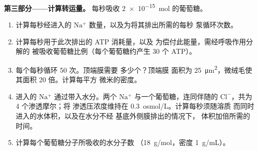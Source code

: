 \begin{problem}
\medskip
\noindent\textbf{第三部分——计算转运量。}
每秒吸收 \qty{2e-15}{mol} 的葡萄糖。
\begin{enumerate}[resume]
  \item 计算每秒经进入的
        $\mathrm{Na^+}$ 数量，以及为将其排出所需的每秒
        泵循环次数。
  \item 计算每秒用于此次排出的 ATP 消耗量，以及
        为偿付此能量，需经呼吸作用分解的
        被吸收葡萄糖比例（每个葡萄糖约产生 30 个 ATP）。
  \item 每个每秒循环 \qty{50}{} 次。顶端膜需要
        多少个？顶端膜
        面积为 \qty{25}{\micro m^2}，微绒毛使其面积
         \qty{20}{} 倍。计算每平方
        微米的密度。
  \item 进入的 $\mathrm{Na^+}$ 通过带入水分。两个
        $\mathrm{Na^+}$ 与一个葡萄糖，连同伴随的
        $\mathrm{Cl^-}$，共为 4 个渗透摩尔；将
        渗透压浓度维持在 \qty{0.3}{osmol/L}。计算每秒须随溶质
        而同时进入的水体积，以及在水分不经
        基底外侧膜排出的情况下，
        体积加倍所需的时间。
  \item 计算每个葡萄糖分子所吸收的水分子数
        （\qty{18}{g/mol}，密度 \qty{1}{g/mL}）。
\end{enumerate}


\end{problem}
